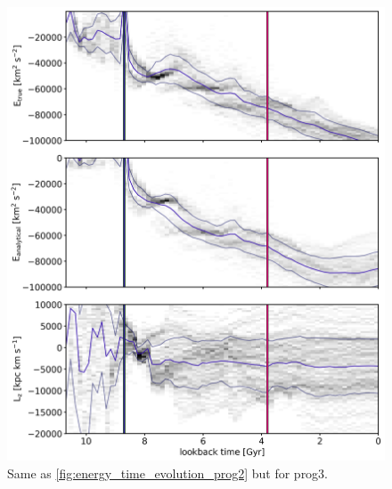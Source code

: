 \begin{figure}
\captionsetup{format=plain}
    \centering
	\includegraphics[width=\textwidth]{plots/Dynamics/prog3/energy_time_evolution_hist_mean.png}
    \caption{Same as \ref{fig:energy_time_evolution_prog2} but for prog3. }\label{fig:energy_time_evolution_prog3}
\end{figure}

